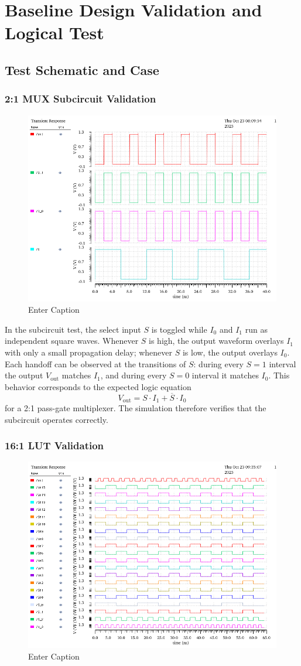 \documentclass[12pt]{article}
\begin{document}
\section{Baseline Design Validation and Logical Test}
\subsection{Test Schematic and Case}
\subsubsection*{2:1 MUX Subcircuit Validation}
\begin{figure}[H]
    \centering
    \includegraphics[width=0.5\linewidth]{writeup//figures/muxsubval.png}
    \caption{Enter Caption}
\end{figure}

In the subcircuit test, the select input \( S \) is toggled while \( I_0 \) and \( I_1 \) run as independent square waves. 
Whenever \( S \) is high, the output waveform overlays \( I_1 \) with only a small propagation delay; whenever \( S \) is low, the output overlays \( I_0 \). 
Each handoff can be observed at the transitions of \( S \): during every \( S=1 \) interval the output \( V_{\text{out}} \) matches \( I_1 \), and during every \( S=0 \) interval it matches \( I_0 \). 
This behavior corresponds to the expected logic equation 
\[
V_{\text{out}} = S \cdot I_1 + \overline{S} \cdot I_0
\]
for a 2:1 pass-gate multiplexer. 
The simulation therefore verifies that the subcircuit operates correctly.

\subsubsection*{16:1 LUT Validation}
\begin{figure}[H]
    \centering
    \includegraphics[width=0.5\linewidth]{writeup//figures/lutval.png}
    \caption{Enter Caption}
\end{figure}
\end{document}
